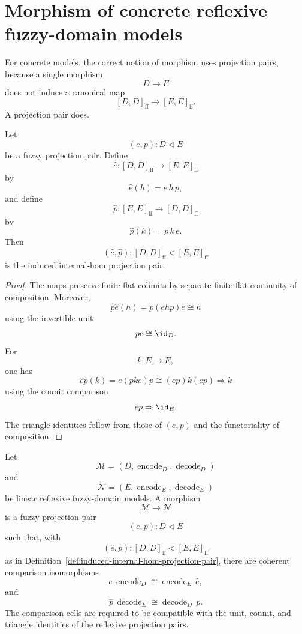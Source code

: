 \section{Morphism of concrete reflexive fuzzy-domain models}
\label{sec:morphisms-concrete-reflexive-models}

For concrete models, the correct notion of morphism uses projection pairs,
because a single morphism
\[
    D\to E
\]
does not induce a canonical map
\[
    [D,D]_{\mathrm{ff}}\to [E,E]_{\mathrm{ff}}.
\]
A projection pair does.

\begin{definition}
\label{def:induced-internal-hom-projection-pair}
Let
\[
    (e,p):D\triangleleft E
\]
be a fuzzy projection pair.  Define
\[
    \widehat e:[D,D]_{\mathrm{ff}}\to [E,E]_{\mathrm{ff}}
\]
by
\[
    \widehat e(h)=e\,h\,p,
\]
and define
\[
    \widehat p:[E,E]_{\mathrm{ff}}\to [D,D]_{\mathrm{ff}}
\]
by
\[
    \widehat p(k)=p\,k\,e.
\]
Then
\[
    (\widehat e,\widehat p):
    [D,D]_{\mathrm{ff}}
    \triangleleft
    [E,E]_{\mathrm{ff}}
\]
is the induced internal-hom projection pair.
\end{definition}

\begin{proof}
The maps preserve finite-flat colimits by separate finite-flat-continuity of
composition.  Moreover,
\[
    \widehat p\widehat e(h)
    =
    p(ehp)e
    \cong
    h
\]
using the invertible unit
\[
    pe\cong \id_D.
\]
For
\[
    k:E\to E,
\]
one has
\[
    \widehat e\widehat p(k)
    =
    e(pke)p
    \cong
    (ep)k(ep)
    \Rightarrow
    k
\]
using the counit comparison
\[
    ep\Rightarrow\id_E.
\]
The triangle identities follow from those of \((e,p)\) and the functoriality
of composition.
\end{proof}

\begin{definition}
\label{def:projection-pair-morphism-linear-reflexive-models}
Let
\[
    \mathcal M=(D,\operatorname{encode}_D,\operatorname{decode}_D)
\]
and
\[
    \mathcal N=(E,\operatorname{encode}_E,\operatorname{decode}_E)
\]
be linear reflexive fuzzy-domain models.  A morphism
\[
    \mathcal M\to\mathcal N
\]
is a fuzzy projection pair
\[
    (e,p):D\triangleleft E
\]
such that, with
\[
    (\widehat e,\widehat p):
    [D,D]_{\mathrm{ff}}\triangleleft [E,E]_{\mathrm{ff}}
\]
as in Definition~\ref{def:induced-internal-hom-projection-pair}, there are
coherent comparison isomorphisms
\[
    e\,\operatorname{encode}_D
    \cong
    \operatorname{encode}_E\,\widehat e,
\]
and
\[
    \widehat p\,\operatorname{decode}_E
    \cong
    \operatorname{decode}_D\,p.
\]
The comparison cells are required to be compatible with the unit, counit, and
triangle identities of the reflexive projection pairs.
\end{definition}

